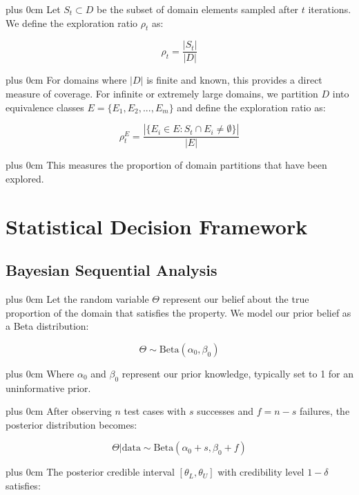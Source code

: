 \documentclass[conference]{IEEEtran}
\newcommand{\justifytext}{\leftskip=0pt \rightskip=0pt plus 0cm}
\begin{document}
\justifytext
Let $S_t \subset D$ be the subset of domain elements sampled after $t$ iterations. We define the exploration ratio $\rho_t$ as:

\begin{equation}
\rho_t = \frac{|S_t|}{|D|}
\end{equation}

\justifytext
For domains where $|D|$ is finite and known, this provides a direct measure of coverage. For infinite or extremely large domains, we partition $D$ into equivalence classes $E = \{E_1, E_2, ..., E_m\}$ and define the exploration ratio as:

\begin{equation}
\rho_t^E = \frac{|\{E_i \in E : S_t \cap E_i \neq \emptyset\}|}{|E|}
\end{equation}

\justifytext
This measures the proportion of domain partitions that have been explored.

\section{Statistical Decision Framework}

\subsection{Bayesian Sequential Analysis}

\justifytext
Let the random variable $\Theta$ represent our belief about the true proportion of the domain that satisfies the property. We model our prior belief as a Beta distribution:

\begin{equation}
\Theta \sim \text{Beta}(\alpha_0, \beta_0)
\end{equation}

\justifytext
Where $\alpha_0$ and $\beta_0$ represent our prior knowledge, typically set to 1 for an uninformative prior.

\justifytext
After observing $n$ test cases with $s$ successes and $f = n - s$ failures, the posterior distribution becomes:

\begin{equation}
\Theta | \text{data} \sim \text{Beta}(\alpha_0 + s, \beta_0 + f)
\end{equation}

\justifytext
The posterior credible interval $[\theta_L, \theta_U]$ with credibility level $1-\delta$ satisfies:
\end{document}
